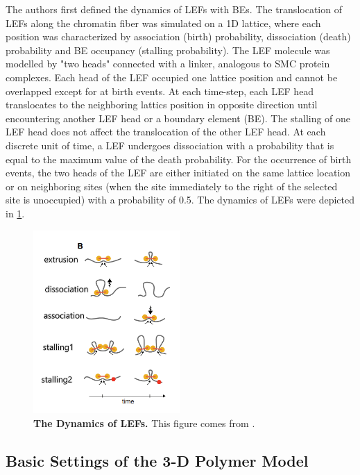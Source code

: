 \documentclass[11pt]{article}
\begin{document}
The authors first defined the dynamics of LEFs with BEs. The translocation of LEFs along the chromatin fiber was simulated on a 1D lattice, where each position was characterized by association (birth) probability, dissociation (death) probability and BE occupancy (stalling probability). The LEF molecule was modelled by "two heads" connected with a linker, analogous to SMC protein complexes. Each head of the LEF occupied one lattice position and cannot be overlapped except for at birth events. At each time-step, each LEF head translocates to the neighboring lattics position in opposite direction until encountering another LEF head or a boundary element (BE). The stalling of one LEF head does not affect the translocation of the other LEF head.
At each discrete unit of time, a LEF undergoes dissociation with a probability that is equal to the maximum value of the death probability. For the occurrence of birth events, the two heads of the LEF are either initiated on the same lattice location or on neighboring sites (when the site immediately to the right of the selected site is unoccupied) with a probability of 0.5. The dynamics of LEFs were depicted in \cref{fig:LEF dynamics}.

\begin{figure}[htbp]
  \centering
  \includegraphics[width=0.5\textwidth]{assets/image-20221212095109951.png}
  \caption{\textbf{The Dynamics of LEFs.} This figure comes from \cite{fudenberg_formation_2016}.}
  \label{fig:LEF dynamics}
\end{figure}

\subsection{Basic Settings of the 3-D Polymer Model}
\end{document}
